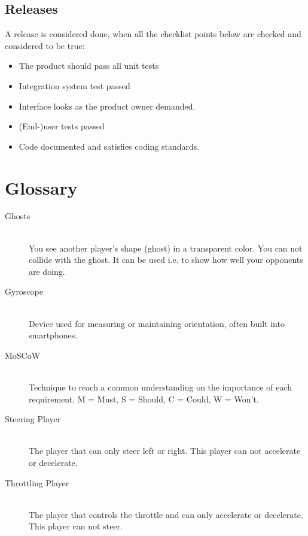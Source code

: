 \documentclass[11pt,twoside,a4paper]{article}
\begin{document}
\subsection{Releases}
A release is considered done, when all the checklist points below are checked and considered to be true:
\begin{itemize}
	\item The product should pass all unit tests
	\item Integration system test passed
	\item Interface looks as the product owner demanded.
	\item (End-)user tests passed
	\item Code documented and satisfies coding standards.
\end{itemize}
\newpage
\section{Glossary}
\begin{description}
\item[Ghosts] \hfill \\
You see another player's shape (ghost) in a transparent color. You can not collide with the ghost. It can be used i.e. to show how well your opponents are doing.
\item[Gyroscope] \hfill \\
Device used for measuring or maintaining orientation, often built into smartphones.
\item[MoSCoW] \hfill \\
Technique to reach a common understanding on the importance of each requirement. M = Must, S = Should, C = Could, W = Won't.
\item[Steering Player] \hfill \\
The player that can only steer left or right. This player can not accelerate or decelerate.
\item[Throttling Player] \hfill \\
The player that controls the throttle and can only accelerate or decelerate. This player can not steer.

\end{description}
\end{document}
